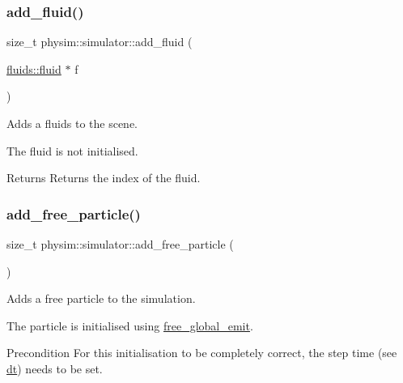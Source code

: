 \subsubsection{\texorpdfstring{add\+\_\+fluid()}{add\_fluid()}}
{\footnotesize\ttfamily size\+\_\+t physim\+::simulator\+::add\+\_\+fluid (\begin{DoxyParamCaption}\item[{\hyperlink{classphysim_1_1fluids_1_1fluid}{fluids\+::fluid} $\ast$}]{f }\end{DoxyParamCaption})}



Adds a fluids to the scene. 

The fluid is not initialised. \begin{DoxyReturn}{Returns}
Returns the index of the fluid. 
\end{DoxyReturn}
\mbox{\label{classphysim_1_1simulator_a6d2b636673f895b006724a6ba310e322}} 
\subsubsection{\texorpdfstring{add\+\_\+free\+\_\+particle()}{add\_free\_particle()}\hspace{0.1cm}{\footnotesize\ttfamily [1/2]}}
{\footnotesize\ttfamily size\+\_\+t physim\+::simulator\+::add\+\_\+free\+\_\+particle (\begin{DoxyParamCaption}{ }\end{DoxyParamCaption})}



Adds a free particle to the simulation. 

The particle is initialised using \hyperlink{classphysim_1_1simulator_a05e2840fc39c644d7005ea938e63202f}{free\+\_\+global\+\_\+emit}. \begin{DoxyPrecond}{Precondition}
For this initialisation to be completely correct, the step time (see \hyperlink{classphysim_1_1simulator_a12a60d0ed819937b51ce50162dbdd6e1}{dt}) needs to be set. 
\end{DoxyPrecond}
\mbox{\label{classphysim_1_1simulator_adc50e1ec0da019bf120db3ae5af27d39}} 
